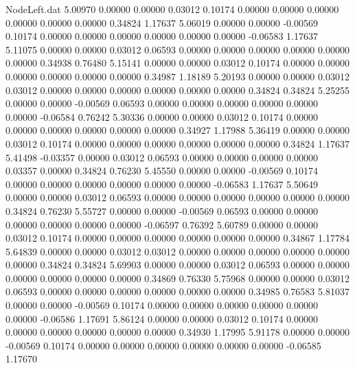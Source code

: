\begin{filecontents}{NodeLeft.dat}
   5.00970    0.00000    0.00000     0.03012    0.10174    0.00000    0.00000    0.00000    0.00000    0.00000    0.00000    0.34824    1.17637
   5.06019    0.00000    0.00000    -0.00569    0.10174    0.00000    0.00000    0.00000    0.00000    0.00000    0.00000   -0.06583    1.17637
   5.11075    0.00000    0.00000     0.03012    0.06593    0.00000    0.00000    0.00000    0.00000    0.00000    0.00000    0.34938    0.76480
   5.15141    0.00000    0.00000     0.03012    0.10174    0.00000    0.00000    0.00000    0.00000    0.00000    0.00000    0.34987    1.18189
   5.20193    0.00000    0.00000     0.03012    0.03012    0.00000    0.00000    0.00000    0.00000    0.00000    0.00000    0.34824    0.34824
   5.25255    0.00000    0.00000    -0.00569    0.06593    0.00000    0.00000    0.00000    0.00000    0.00000    0.00000   -0.06584    0.76242
   5.30336    0.00000    0.00000     0.03012    0.10174    0.00000    0.00000    0.00000    0.00000    0.00000    0.00000    0.34927    1.17988
   5.36419    0.00000    0.00000     0.03012    0.10174    0.00000    0.00000    0.00000    0.00000    0.00000    0.00000    0.34824    1.17637
   5.41498   -0.03357    0.00000     0.03012    0.06593    0.00000    0.00000    0.00000    0.00000    0.03357    0.00000    0.34824    0.76230
   5.45550    0.00000    0.00000    -0.00569    0.10174    0.00000    0.00000    0.00000    0.00000    0.00000    0.00000   -0.06583    1.17637
   5.50649    0.00000    0.00000     0.03012    0.06593    0.00000    0.00000    0.00000    0.00000    0.00000    0.00000    0.34824    0.76230
   5.55727    0.00000    0.00000    -0.00569    0.06593    0.00000    0.00000    0.00000    0.00000    0.00000    0.00000   -0.06597    0.76392
   5.60789    0.00000    0.00000     0.03012    0.10174    0.00000    0.00000    0.00000    0.00000    0.00000    0.00000    0.34867    1.17784
   5.64839    0.00000    0.00000     0.03012    0.03012    0.00000    0.00000    0.00000    0.00000    0.00000    0.00000    0.34824    0.34824
   5.69903    0.00000    0.00000     0.03012    0.06593    0.00000    0.00000    0.00000    0.00000    0.00000    0.00000    0.34869    0.76330
   5.75968    0.00000    0.00000     0.03012    0.06593    0.00000    0.00000    0.00000    0.00000    0.00000    0.00000    0.34985    0.76583
   5.81037    0.00000    0.00000    -0.00569    0.10174    0.00000    0.00000    0.00000    0.00000    0.00000    0.00000   -0.06586    1.17691
   5.86124    0.00000    0.00000     0.03012    0.10174    0.00000    0.00000    0.00000    0.00000    0.00000    0.00000    0.34930    1.17995
   5.91178    0.00000    0.00000    -0.00569    0.10174    0.00000    0.00000    0.00000    0.00000    0.00000    0.00000   -0.06585    1.17670

\end{filecontents}
